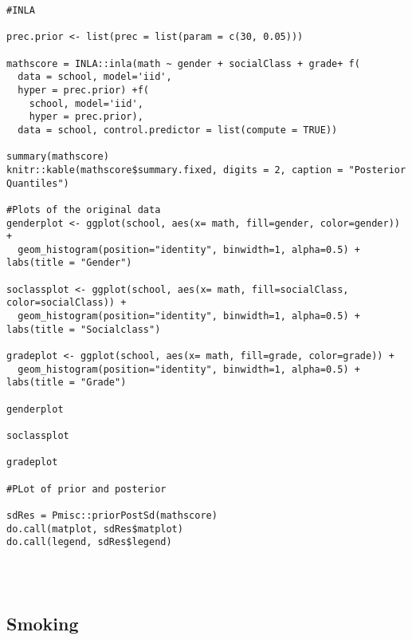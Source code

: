 \documentclass[
  12pt,
]{article}
\begin{document}
\begin{verbatim}
#INLA

prec.prior <- list(prec = list(param = c(30, 0.05)))

mathscore = INLA::inla(math ~ gender + socialClass + grade+ f(
  data = school, model='iid', 
  hyper = prec.prior) +f(
    school, model='iid', 
    hyper = prec.prior), 
  data = school, control.predictor = list(compute = TRUE))

summary(mathscore)
knitr::kable(mathscore$summary.fixed, digits = 2, caption = "Posterior Quantiles")

#Plots of the original data
genderplot <- ggplot(school, aes(x= math, fill=gender, color=gender)) +
  geom_histogram(position="identity", binwidth=1, alpha=0.5) + labs(title = "Gender")

soclassplot <- ggplot(school, aes(x= math, fill=socialClass, color=socialClass)) +
  geom_histogram(position="identity", binwidth=1, alpha=0.5) + labs(title = "Socialclass")

gradeplot <- ggplot(school, aes(x= math, fill=grade, color=grade)) +
  geom_histogram(position="identity", binwidth=1, alpha=0.5) + labs(title = "Grade")

genderplot

soclassplot

gradeplot

#PLot of prior and posterior

sdRes = Pmisc::priorPostSd(mathscore)
do.call(matplot, sdRes$matplot)
do.call(legend, sdRes$legend)




\end{verbatim}

\hypertarget{smoking}{%
\subsection{Smoking}\label{smoking}}
\end{document}
